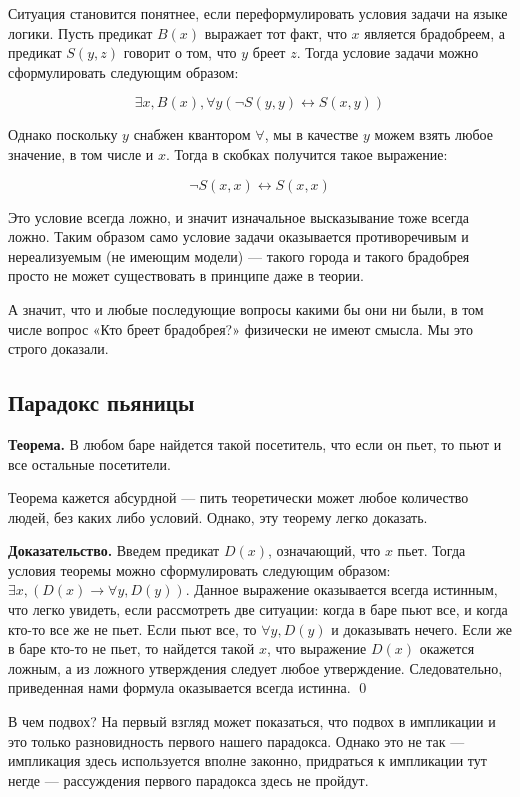 Ситуация становится понятнее, если переформулировать условия задачи на языке логики. Пусть предикат $B(x)$ выражает тот факт, что $x$ является брадобреем, а предикат $S(y, z)$ говорит о том, что $y$ бреет $z$. Тогда условие задачи можно сформулировать следующим образом:

$$\exists x, B(x), \forall y (\neg S(y, y) \leftrightarrow S(x, y))$$

Однако поскольку $y$ снабжен квантором $\forall$, мы в качестве $y$ можем взять любое значение, в том числе и $x$. Тогда в скобках получится такое выражение:

$$\neg S(x, x) \leftrightarrow S(x, x)$$

Это условие всегда ложно, и значит изначальное высказывание тоже всегда ложно. Таким образом само условие задачи оказывается противоречивым и нереализуемым (не имеющим модели) — такого города и такого брадобрея просто не может существовать в принципе даже в теории.

А значит, что и любые последующие вопросы какими бы они ни были, в том числе вопрос «Кто бреет брадобрея?» физически не имеют смысла. Мы это строго доказали.

\subsection{Парадокс пьяницы}

{\bfseries Теорема.} В любом баре найдется такой посетитель, что если он пьет, то пьют и все остальные посетители.

Теорема кажется абсурдной — пить теоретически может любое количество людей, без каких либо условий. Однако, эту теорему легко доказать.

{\bfseries Доказательство.} Введем предикат $D(x)$, означающий, что $x$ пьет. Тогда условия теоремы можно сформулировать следующим образом: $\exists x, (D(x) \rightarrow \forall y, D(y))$. Данное выражение оказывается всегда истинным, что легко увидеть, если рассмотреть две ситуации: когда в баре пьют все, и когда кто-то все же не пьет. Если пьют все, то $\forall y, D(y)$ и доказывать нечего. Если же в баре кто-то не пьет, то найдется такой $x$, что выражение $D(x)$ окажется ложным, а из ложного утверждения следует любое утверждение. Следовательно, приведенная нами формула оказывается всегда истинна. \qed

В чем подвох? На первый взгляд может показаться, что подвох в импликации и это только разновидность первого нашего парадокса. Однако это не так — импликация здесь используется вполне законно, придраться к импликации тут негде — рассуждения первого парадокса здесь не пройдут.


